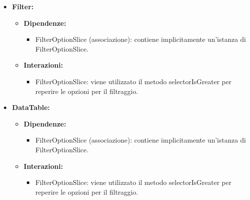 \begin{itemize}
      \item \textbf{Filter:}
            \begin{itemize}
                  \item \textbf{Dipendenze:}
                        \begin{itemize}
                              \item FilterOptionSlice (associazione): contiene implicitamente un'istanza di
                                    FilterOptionSlice.
                        \end{itemize}
                  \item \textbf{Interazioni:}
                        \begin{itemize}
                              \item FilterOptionSlice: viene utilizzato il metodo selectorIsGreater per reperire le
                                    opzioni per il filtraggio.
                        \end{itemize}
            \end{itemize}

      \item \textbf{DataTable:}
            \begin{itemize}
                  \item \textbf{Dipendenze:}
                        \begin{itemize}
                              \item FilterOptionSlice (associazione): contiene implicitamente un'istanza di
                                    FilterOptionSlice.
                        \end{itemize}
                  \item \textbf{Interazioni:}
                        \begin{itemize}
                              \item FilterOptionSlice: viene utilizzato il metodo selectorIsGreater per reperire le
                                    opzioni per il filtraggio.
                        \end{itemize}
            \end{itemize}


\end{itemize}
